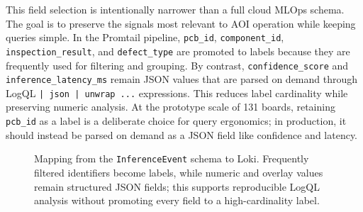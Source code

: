 \documentclass[12pt,a4paper]{article}
\begin{document}
This field selection is intentionally narrower than a full cloud MLOps schema.
The goal is to preserve the signals most relevant to AOI operation while
keeping queries simple. In the Promtail pipeline, \texttt{pcb\_id},
\texttt{component\_id}, \texttt{inspection\_result}, and
\texttt{defect\_type} are promoted to labels because they are frequently used
for filtering and grouping. By contrast, \texttt{confidence\_score} and
\texttt{inference\_latency\_ms} remain JSON values that are parsed on demand
through LogQL \texttt{| json | unwrap ...} expressions. This reduces label
cardinality while preserving numeric analysis.
At the prototype scale of 131 boards, retaining \texttt{pcb\_id} as a label is
a deliberate choice for query ergonomics; in production, it should instead be
parsed on demand as a JSON field like confidence and latency.

\begin{figure}[!ht]
\centering
\small
{}
\caption{Mapping from the \texttt{InferenceEvent} schema to Loki. Frequently filtered identifiers become labels, while numeric and overlay values remain structured JSON fields; this supports reproducible LogQL analysis without promoting every field to a high-cardinality label.}
\label{fig:event_label_mapping}
\end{figure}
\end{document}
